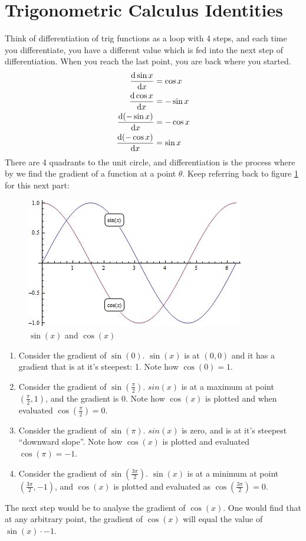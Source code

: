 \section{Trigonometric Calculus Identities}
\label{sec:TrigCalculus}
Think of differentiation of trig functions as a loop with 4 steps, and each time
you differentiate, you have a different value which is fed into the next step of
differentiation. When you reach the last point, you are back where you
started.
\begin{align}
  \frac{\mathrm{d}\sin{x}}{\mathrm{d}x}  & = \cos{x} \\
  \frac{\mathrm{d}\cos{x}}{\mathrm{d}x}  & = -\sin{x} \\
  \frac{\mathrm{d}(-\sin{x})}{\mathrm{d}x} & = -\cos{x} \\
  \frac{\mathrm{d}(-\cos{x})}{\mathrm{d}x} & = \sin{x}
\end{align}
There are 4 quadrants to the unit circle, and differentiation is the process
where by we find the gradient of a function at a point $\theta$. Keep referring
back to figure \ref{fig:TrigCalcSinxCosx} for this next part:  
 \begin{figure}[!htb]
  \begin{center}
    \includegraphics{img/sinxcosx}
    \caption{$\sin(x)$ and $\cos(x)$}
    \label{fig:TrigCalcSinxCosx}
  \end{center}
\end{figure}
\begin{enumerate}
  \item Consider the gradient of $\sin(0)$. $\sin(x)$ is at $(0,0)$ and it has a
  gradient that is at it's steepest: 1. Note how $\cos(0)=1$.
  \item Consider the gradient of $\sin(\frac{\pi}{2})$. $sin(x)$ is at a maximum
  at point $(\frac{\pi}{2},1)$, and the gradient is $0$. Note how
  $\cos(x)$ is plotted and when evaluated $\cos(\frac{\pi}{2})=0$.
  \item Consider the gradient of $\sin(\pi)$. $sin(x)$ is zero, and is at it's
  steepest ``downward slope''. Note how $\cos(x)$ is plotted and evaluated
  $\cos(\pi)=-1$.
  \item Consider the gradient of $\sin(\frac{3\pi}{2})$. $\sin(x)$ is at a
  minimum at point $(\frac{3\pi}{2},-1)$, and $\cos(x)$ is plotted and
  evaluated as $\cos(\frac{3\pi}{2})=0$.
\end{enumerate}
The next step would be to analyse the gradient of $\cos(x)$. One would find that
at any arbitrary point, the gradient of $\cos(x)$ will equal the value of
$\sin(x) \cdot -1$.

